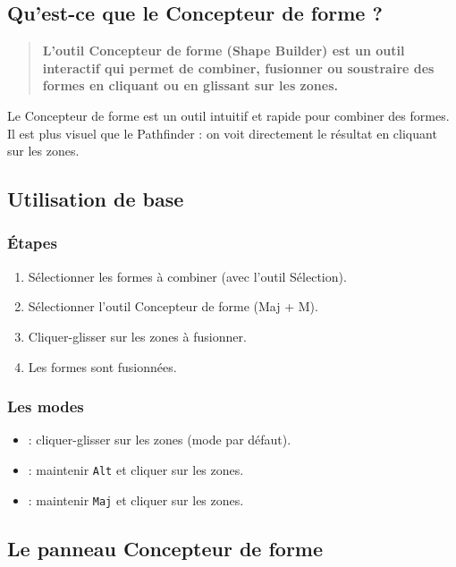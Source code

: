 \subsection{Qu'est-ce que le Concepteur de forme ?}

\begin{quote}
\textbf{L'outil Concepteur de forme (Shape Builder) est un outil interactif qui permet de combiner, fusionner ou soustraire des formes en cliquant ou en glissant sur les zones.}
\end{quote}

Le Concepteur de forme est un outil intuitif et rapide pour combiner des formes. Il est plus visuel que le Pathfinder : on voit directement le résultat en cliquant sur les zones.

\subsection{Utilisation de base}

\subsubsection{Étapes}

\begin{enumerate}
    \item Sélectionner les formes à combiner (avec l'outil Sélection).
    \item Sélectionner l'outil Concepteur de forme (Maj + M).
    \item Cliquer-glisser sur les zones à fusionner.
    \item Les formes sont fusionnées.
\end{enumerate}

\subsubsection{Les modes}

\begin{itemize}
    \item {} : cliquer-glisser sur les zones (mode par défaut).
    \item {} : maintenir \texttt{Alt} et cliquer sur les zones.
    \item {} : maintenir \texttt{Maj} et cliquer sur les zones.
\end{itemize}

\subsection{Le panneau Concepteur de forme}

